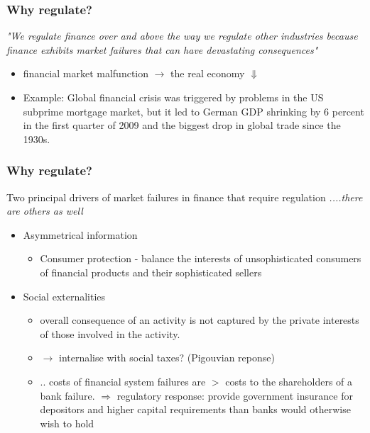 \documentclass[11pt]{beamer}
\begin{document}
\begin{frame}
\frametitle{Why regulate?}

\textit{"We regulate finance over and above the way we regulate
other industries because finance exhibits market failures
that can have devastating consequences"}
\hfill \break
\begin{itemize}
\item financial market malfunction $\rightarrow$ the real economy $\Downarrow$
\item Example: Global financial crisis was triggered by problems in the US subprime mortgage market, but it led to German GDP shrinking by 6 percent in the first quarter of 2009 and the biggest drop in global trade since the 1930s.
\end{itemize}

\end{frame}
\begin{frame}
\frametitle{Why regulate?}

Two principal drivers of market failures in finance that require
regulation
\textit{....there are others as well}
\hfill \break
\begin{itemize}
\item  Asymmetrical information
\begin{itemize}
\item Consumer protection - balance the interests of unsophisticated consumers of financial products and their sophisticated sellers
\end{itemize}
\item Social externalities
\begin{itemize}
\item  overall consequence of an activity is not captured
by the private interests of those involved in the activity.
\item $\rightarrow$ internalise with social taxes? (Pigouvian reponse)
\item .. costs of financial system failures are $>$ costs to the shareholders of a bank failure. $\Rightarrow$ regulatory
response: provide government insurance for depositors and higher capital requirements than banks would otherwise wish to hold
\end{itemize}
\end{itemize}
\end{frame}
\end{document}

